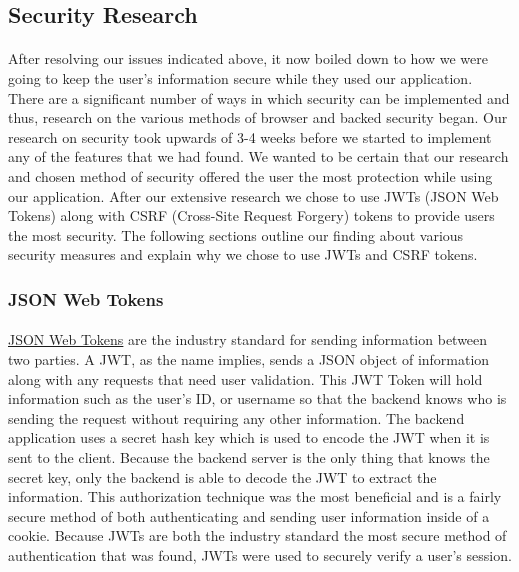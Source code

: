 \documentclass[12pt]{article}
\begin{document}
\subsection{Security Research}
\paragraph{}
	After resolving our issues indicated above, it now boiled down to how we were going to keep the user's information secure while they used our application. There are a significant number of ways in which security can be implemented and thus, research on the various methods of browser and backed security began. Our research on security took upwards of 3-4 weeks before we started to implement any of the features that we had found. We wanted to be certain that our research and chosen method of security offered the user the most protection while using our application. After our extensive research we chose to use JWTs (JSON Web Tokens) along with CSRF (Cross-Site Request Forgery) tokens to provide users the most security. The following sections outline our finding about various security measures and explain why we chose to use JWTs and CSRF tokens.

	\subsubsection{JSON Web Tokens}
	\paragraph{}
		\href{https://jwt.io/introduction/}{JSON Web Tokens} are the industry standard for sending information between two parties. A JWT, as the name implies, sends  a JSON object of information along with any requests that need user validation. This JWT Token will hold information such as the user's ID, or username so that the backend knows who is sending the request without requiring any other information. The backend application uses a secret hash key which is used to encode the JWT when it is sent to the client. Because the backend server is the only thing that knows the secret key, only the backend is able to decode the JWT to extract the information. This authorization technique was the most beneficial and is a fairly secure method of both authenticating and sending user information inside of a cookie. Because JWTs are both the industry standard the most secure method of authentication that was found, JWTs were used to securely verify a user's session.
	
\end{document}
